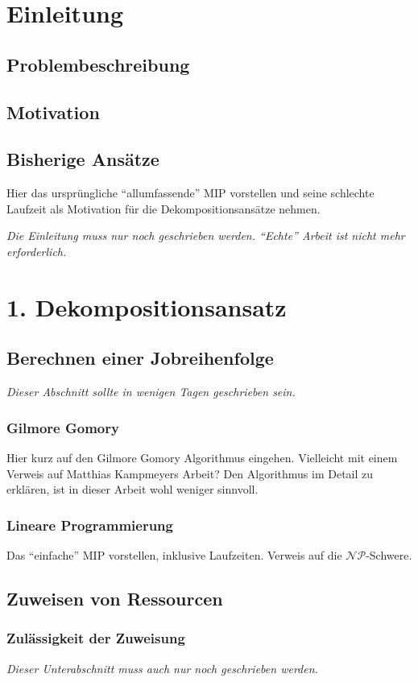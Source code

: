 \documentclass{scrreprt}
\begin{document}
\tableofcontents

\chapter{Einleitung}
\section{Problembeschreibung}
\section{Motivation}
\section{Bisherige Ansätze}
Hier das ursprüngliche "`allumfassende"' MIP vorstellen und seine schlechte Laufzeit als Motivation für die Dekompositionsansätze nehmen.

\textit{Die Einleitung muss nur noch geschrieben werden. "`Echte"' Arbeit ist nicht mehr erforderlich.}


\chapter{1. Dekompositionsansatz}
\section{Berechnen einer Jobreihenfolge}
\textit{Dieser Abschnitt sollte in wenigen Tagen geschrieben sein.}
\subsection{Gilmore Gomory}
Hier kurz auf den Gilmore Gomory Algorithmus eingehen. Vielleicht mit einem Verweis auf Matthias Kampmeyers Arbeit?
Den Algorithmus im Detail zu erklären, ist in dieser Arbeit wohl weniger sinnvoll.

\subsection{Lineare Programmierung}
Das "`einfache"' MIP vorstellen, inklusive Laufzeiten.
Verweis auf die $\mathcal{NP}$-Schwere.


\section{Zuweisen von Ressourcen}
\subsection{Zulässigkeit der Zuweisung}
\textit{Dieser Unterabschnitt muss auch nur noch geschrieben werden.}
\end{document}
